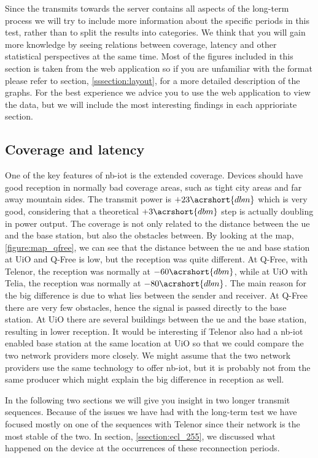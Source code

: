 \documentclass[USenglish]{ifimaster}  %
\begin{document}
Since the transmits towards the server contains all aspects of the long-term process we will try to include more information about the specific periods in this test, rather than to split the results into categories. We think that you will gain more knowledge by seeing relations between coverage, latency and other statistical perspectives at the same time. Most of the figures included in this section is taken from the web application so if you are unfamiliar with the format please refer to section, \vref{sssection:layout}, for a more detailed description of the graphs. For the best experience we advice you to use the web application to view the data, but we will include the most interesting findings in each apprioriate section.

\subsection{Coverage and latency}
One of the key features of \acrshort{nb-iot} is the extended coverage. Devices should have good reception in normally bad coverage areas, such as tight city areas and far away mountain sides. The transmit power is ${+23 \acrshort{dbm}}$ which is very good, considering that a theoretical ${+3 \acrshort{dbm}}$ step is actually doubling in power output. The coverage is not only related to the distance between the \acrshort{ue} and the base station, but also the obstacles between. By looking at the map, \vref{figure:map_qfree}, we can see that the distance between the \acrshort{ue} and base station at UiO and Q-Free is low, but the reception was quite different. At Q-Free, with Telenor, the reception was normally at ${-60 \acrshort{dbm}}$, while at UiO with Telia, the reception was normally at ${-80 \acrshort{dbm}}$.
The main reason for the big difference is due to what lies between the sender and receiver. At Q-Free there are very few obstacles, hence the signal is passed directly to the base station. At UiO there are several buildings between the \acrshort{ue} and the base station, resulting in lower reception. It would be interesting if Telenor also had a \acrshort{nb-iot} enabled base station at the same location at UiO so that we could compare the two network providers more closely. We might assume that the two network providers use the same technology to offer \acrshort{nb-iot}, but it is probably not from the same producer which might explain the big difference in reception as well.

In the following two sections we will give you insight in two longer transmit sequences. Because of the issues we have had with the long-term test we have focused mostly on one of the sequences with Telenor since their network is the most stable of the two. In section, \vref{ssection:ecl_255}, we discussed what happened on the device at the occurrences of these reconnection periods.
\end{document}
